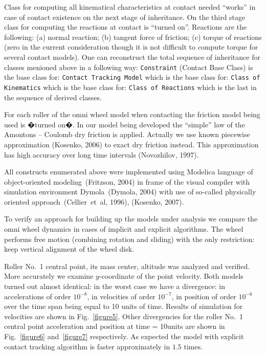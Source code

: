 \documentclass{jsme-tj}
\begin{document}
Class for computing all kinematical characteristics at contact needed ``works''
in case of contact existence on the next stage of inheritance. On the third
stage class for computing the reactions at contact is ``turned on''. Reactions 
are the following: (a) normal reaction; (b) tangent force of friction; (c) 
torque of reactions (zero in the current consideration though it is not 
difficult to compute torque for several contact models). One can reconstruct 
the total sequence of inheritance for classes menioned above in a following 
way: {\tt Constraint} (Contact Base Class) is the base class for: {\tt Contact 
Tracking Model} which is the base class for: {\tt Class of Kinematics} which is 
the base class for: {\tt Class of Reactions} which is the last in the sequence 
of derived classes.

For each roller of the omni wheel model when contacting the friction model 
being used is �turned on�. In our model being developed the ``simple'' law of 
the Amontons -- Coulomb dry friction is applied. Actually we use known 
piecewise approximation (Kosenko, 2006) to exact dry friction instead. This 
approximation has high accuracy over long time intervals (Novozhilov, 1997).

All constructs enumerated above were implemented using Modelica language of
object-oriented modeling~(Fritzson, 2004) in frame of the visual compiler with
simulation environment Dymola~(Dymola, 2004) with use of so-called 
physically oriented approach~(Cellier~et~al, 1996), (Kosenko, 2007).

To verify an approach for building up the models under analysis we compare the
omni wheel dynamics in cases of implicit and explicit algorithms. The wheel 
performs free motion (combining rotation and sliding) with the only 
restriction: keep vertical alignment of the wheel disk.

Roller No.~1 central point, its mass center, altitude was analyzed and 
verified. More accurately we examine $y$-coordinate of the point velocity. Both 
models turned out almost identical: in the worst case we have a divergence: in
accelerations of order $10^{-8}$, in velocities of order $10^{-7}$, in position
of order $10^{-6}$ over the time span being equal to 10 units of time. Results 
of simulation for velocities are shown in Fig.~\ref{figure5}. Other 
divergencies for the roller No.~1 central point acceleration and position at 
time = 10units are shown in Fig.~\ref{figure6} and~\ref{figure7} respectively. 
As expected the model with explicit contact tracking algorithm is faster 
approximately in $1.5$ times.
\end{document}
